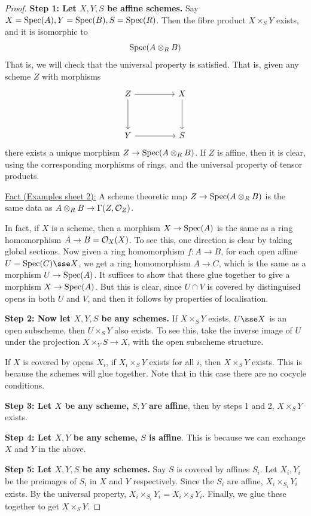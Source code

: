 \documentclass{article}
\begin{document}
\begin{proof}
    \textbf{Step 1: Let \(X, Y, S\) be affine schemes.} Say \(X = \operatorname{Spec}(A), Y = \operatorname{Spec}(B), S = \operatorname{Spec}(R)\). Then the fibre product \(X\times_S Y\) exists, and it is isomorphic to
    \[\operatorname{Spec}(A \otimes_R B)\]
    That is, we will check that the universal property is satisfied. That is, given any scheme \(Z\) with morphisms
\[\begin{tikzcd}
	Z && X \\
	\\
	Y && S
	\arrow[from=1-1, to=1-3]
	\arrow[from=1-1, to=3-1]
	\arrow[from=3-1, to=3-3]
	\arrow[from=1-3, to=3-3]
\end{tikzcd}\]
    there exists a unique morphism \(Z \to \operatorname{Spec}(A \otimes_R B)\). If \(Z\) is affine, then it is clear, using the corresponding morphisms of rings, and the universal property of tensor products.

    \underline{Fact (Examples sheet 2):} A scheme theoretic map \(Z \to \operatorname{Spec}(A \otimes_R B)\) is the same data as \(A \otimes_R B \to \Gamma(Z, \mathcal{O}_Z)\). \begin{addendum}
        In fact, if \(X\) is a scheme, then a morphism \(X \to \operatorname{Spec}(A)\) is the same as a ring homomorphism \(A \to B = \mathcal{O}_X(X)\). To see this, one direction is clear by taking global sections. Now given a ring homomorphism \(f : A \to B\), for each open affine \(U = \Spec(C) \sse X\), we get a ring homomorphism \(A \to C\), which is the same as a morphism \(U \to \operatorname{Spec}(A)\). It suffices to show that these glue together to give a morphism \(X \to \operatorname{Spec}(A)\). But this is clear, since \(U \cap V\) is covered by distinguised opens in both \(U\) and \(V\), and then it follows by properties of localisation.
    \end{addendum}

    \textbf{Step 2: Now let \(X, Y, S\) be any schemes.} If \(X \times_S Y\) exists, \(U \sse X\) is an open subscheme, then \(U \times_S Y\) also exists. To see this, take the inverse image of \(U\) under the projection \(X \times_Y S \to X\), with the open subscheme structure.

    If \(X\) is covered by opens \(X_i\), if \(X_i \times_S Y\) exists for all \(i\), then \(X \times_S Y\) exists. This is because the schemes will glue together. Note that in this case there are no cocycle conditions.

    \textbf{Step 3: Let \(X\) be any scheme, \(S, Y\) are affine}, then by steps 1 and 2, \(X \times_S Y\) exists.

    \textbf{Step 4: Let \(X, Y\) be any scheme, \(S\) is affine}. This is because we can exchange \(X\) and \(Y\) in the above.

    \textbf{Step 5: Let \(X, Y, S\) be any schemes.} Say \(S\) is covered by affines \(S_i\). Let \(X_i, Y_i\) be the preimages of \(S_i\) in \(X\) and \(Y\) respectively. Since the \(S_i\) are affine, \(X_i \times_{S_i}Y_i\) exists. By the universal property, \(X_i \times_{S_i} Y_i = X_i \times_S Y_i\). Finally, we glue these together to get \(X \times_S Y\).
\end{proof}
\end{document}
